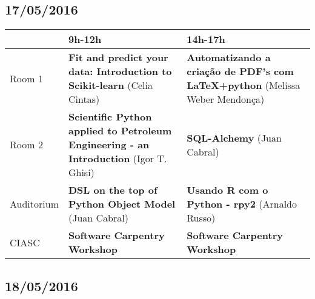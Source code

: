 \documentclass[12pt]{article}
\begin{document}
\subsection*{17/05/2016}

\begin{center}
     \begin{tabular}{@{}l p{5cm} p{5cm}@{}}
     \toprule
      & 9h-12h & 14h-17h\\\midrule
     Room 1 & \textbf{Fit and predict your data: Introduction to Scikit-learn}
     (Celia Cintas) & \textbf{Automatizando a criação de PDF's com LaTeX+python} (Melissa Weber Mendonça)\\
     Room 2 & \textbf{Scientific Python applied to Petroleum Engineering - an
     Introduction} (Igor T. Ghisi) & \textbf{SQL-Alchemy} (Juan Cabral)\\
     Auditorium & \textbf{DSL on the top of Python Object Model} (Juan Cabral) & \textbf{Usando R com o Python - rpy2} (Arnaldo Russo)\\
     CIASC & \textbf{Software Carpentry Workshop} & \textbf{Software Carpentry Workshop} \\\bottomrule
   \end{tabular}
\end{center}

\newpage

\subsection*{18/05/2016}
\end{document}
